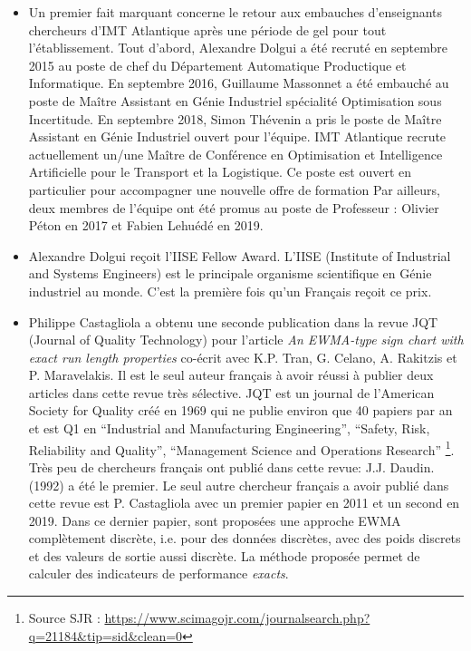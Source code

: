 \begin{itemize}
    \item Un premier fait marquant concerne le retour aux embauches d'enseignants chercheurs d'IMT Atlantique après une période de gel pour tout l'établissement.  
    Tout d'abord, Alexandre Dolgui a été recruté en septembre 2015 au poste de chef du Département Automatique Productique et Informatique.
    En septembre 2016, Guillaume Massonnet a été embauché au poste de Maître Assistant en Génie Industriel spécialité Optimisation sous Incertitude.
    En septembre 2018, Simon Thévenin a pris le poste de Maître Assistant en Génie Industriel ouvert pour l'équipe. 
    IMT Atlantique recrute actuellement un/une Maître de Conférence en Optimisation et Intelligence Artificielle pour le Transport et la Logistique. Ce poste est ouvert en particulier pour accompagner une nouvelle offre de formation 
    Par ailleurs, deux membres de l'équipe ont été promus au poste de Professeur : Olivier Péton en 2017 et Fabien Lehuédé en 2019.
    \item Alexandre Dolgui reçoit l'IISE Fellow Award. L'IISE (Institute of Industrial and Systems Engineers) est le principale organisme scientifique en Génie industriel au monde. C'est la première fois qu'un Français reçoit ce prix.
    \item 
    Philippe Castagliola a obtenu une seconde publication dans la revue JQT (Journal of Quality Technology)  \cite{castagliola:hal-02002980} pour l'article 
    {\it An EWMA-type sign chart with exact run length properties}
    co-écrit avec K.P. Tran, G. Celano, A. Rakitzis et P. Maravelakis. Il est le seul auteur français à avoir réussi à publier deux articles dans cette revue très sélective.
    JQT est un journal de l'American Society for Quality créé en 1969 qui ne publie environ que 40 papiers par an et est Q1 en ``Industrial and Manufacturing Engineering'', ``Safety, Risk, Reliability and Quality'', ``Management Science and Operations Research'' \footnote{Source SJR : \url{https://www.scimagojr.com/journalsearch.php?q=21184&tip=sid&clean=0}}. Très peu de chercheurs français ont publié dans cette revue: J.J. Daudin. (1992) a été le premier. Le seul autre chercheur français a avoir publié dans cette revue est P. Castagliola avec un premier papier en 2011 et un second en 2019.
    Dans ce dernier papier, sont proposées une approche EWMA complètement discrète, i.e. pour des données discrètes, avec des poids discrets et des valeurs de sortie aussi discrète. La méthode proposée permet de calculer des indicateurs de performance \emph{exacts}. 

\end{itemize}
